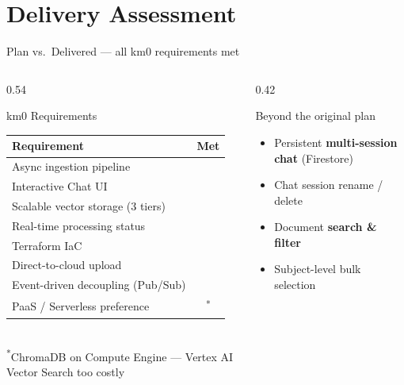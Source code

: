 \documentclass[aspectratio=169]{beamer}
\newcommand{\cmark}{\textcolor{OK}{\checkmark}}
\begin{document}
\section{Delivery Assessment}

\begin{frame}[t,shrink=3]{Plan vs.\ Delivered — all km0 requirements met}
  \begin{columns}[t]
    \begin{column}{0.54\textwidth}
      \begin{block}{km0 Requirements}
        {\footnotesize\renewcommand{\arraystretch}{1.3}
        \begin{tabularx}{\linewidth}{@{}Xc@{}}
          \toprule
          \textbf{Requirement} & \textbf{Met} \\
          \midrule
          Async ingestion pipeline           & \cmark \\
          Interactive Chat UI                & \cmark \\
          Scalable vector storage (3 tiers)  & \cmark \\
          Real-time processing status        & \cmark \\
          Terraform IaC                      & \cmark \\
          Direct-to-cloud upload             & \cmark \\
          Event-driven decoupling (Pub/Sub)  & \cmark \\
          PaaS / Serverless preference       & \cmark\textsuperscript{*} \\
          \bottomrule
        \end{tabularx}\\[0.12cm]
        \textsuperscript{*}\scriptsize ChromaDB on Compute Engine
        — Vertex AI Vector Search too costly}
      \end{block}
    \end{column}
    \begin{column}{0.42\textwidth}
      \begin{block}{Beyond the original plan}
        \begin{itemize}\setlength\itemsep{0.18em}
          \item Persistent \textbf{multi-session chat} (Firestore)
          \item Chat session rename / delete
          \item Document \textbf{search \& filter}
          \item Subject-level bulk selection

\end{itemize}
\end{block}
\end{column}
\end{columns}
\end{frame}
\end{document}
